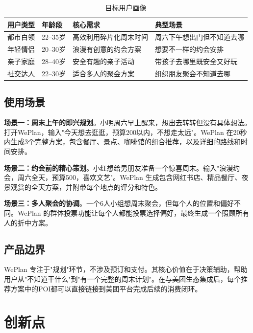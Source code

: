 \documentclass[12pt,a4paper]{ctexart}
\begin{document}
\begin{table}[H]
\centering
\caption{目标用户画像}
\label{tab:user-persona}
\renewcommand{\arraystretch}{1.4}
{\small
\begin{tabular}{p{2.5cm} p{2.5cm} p{3cm} p{4cm}}
\toprule
\textbf{用户类型} & \textbf{年龄段} & \textbf{核心需求} & \textbf{典型场景} \\
\midrule
都市白领 & 22--35岁 & 高效利用碎片化周末时间 & 周六下午想出门但不知道去哪 \\
年轻情侣 & 20--30岁 & 浪漫有创意的约会方案 & 想要不一样的约会安排 \\
亲子家庭 & 28--40岁 & 安全有趣的亲子活动 & 带孩子去哪里既安全又好玩 \\
社交达人 & 22--30岁 & 适合多人的聚会方案 & 组织朋友聚会不知道去哪 \\
\bottomrule
\end{tabular}
}
\end{table}

\subsection{使用场景}

\textbf{场景一：周末上午的即兴规划}。小明周六早上醒来，想出去转转但没有具体想法。打开WePlan，输入"今天想去逛逛，预算200以内，不想走太远"。WePlan 在20秒内生成3个完整方案，包含餐厅、景点、咖啡馆的组合推荐，以及详细的路线和时间安排。

\textbf{场景二：约会前的精心策划}。小红想给男朋友准备一个惊喜周末。输入"浪漫约会，周六全天，预算500，喜欢文艺"。WePlan 生成包含网红书店、精品餐厅、夜景观赏的全天方案，并附带每个地点的评分和特色。

\textbf{场景三：多人聚会的协调}。一个6人小组想周末聚会，但每个人的位置和偏好不同。WePlan 的群体投票功能让每个人都能投票选择偏好，最终生成一个照顾所有人的折中方案。

\subsection{产品边界}

WePlan 专注于"规划"环节，不涉及预订和支付。其核心价值在于决策辅助，帮助用户从"不知道干什么"到"有一个完整的周末计划"。在与美团生态集成后，每个推荐方案中的POI都可以直接链接到美团平台完成后续的消费闭环。

\newpage

\section{创新点}
\end{document}

